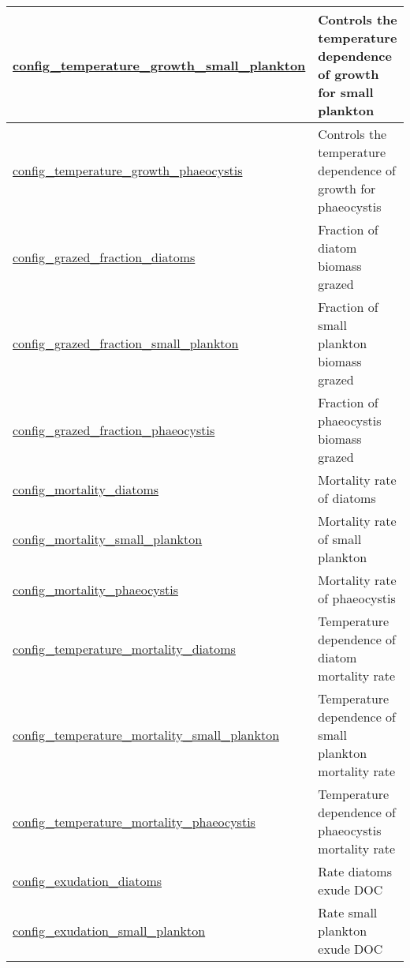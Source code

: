{\begin{center}
\begin{longtable}{| p{2.0in} || p{4.0in} |}
    \hline
    \hyperref[subsec:nm_sec_config_temperature_growth_small_plankton]{config\_temperature\_growth\_\-small\_plankton} & Controls the temperature dependence of growth for small plankton \\
    \hline
    \hyperref[subsec:nm_sec_config_temperature_growth_phaeocystis]{config\_temperature\_growth\_\-phaeocystis} & Controls the temperature dependence of growth for phaeocystis \\
    \hline
    \hyperref[subsec:nm_sec_config_grazed_fraction_diatoms]{config\_grazed\_fraction\_diatoms} & Fraction of diatom biomass grazed \\
    \hline
    \hyperref[subsec:nm_sec_config_grazed_fraction_small_plankton]{config\_grazed\_fraction\_small\_\-plankton} & Fraction of small plankton biomass grazed \\
    \hline
    \hyperref[subsec:nm_sec_config_grazed_fraction_phaeocystis]{config\_grazed\_fraction\_\-phaeocystis} & Fraction of phaeocystis biomass grazed \\
    \hline
    \hyperref[subsec:nm_sec_config_mortality_diatoms]{config\_mortality\_diatoms} & Mortality rate of diatoms \\
    \hline
    \hyperref[subsec:nm_sec_config_mortality_small_plankton]{config\_mortality\_small\_\-plankton} & Mortality rate of small plankton \\
    \hline
    \hyperref[subsec:nm_sec_config_mortality_phaeocystis]{config\_mortality\_phaeocystis} & Mortality rate of phaeocystis \\
    \hline
    \hyperref[subsec:nm_sec_config_temperature_mortality_diatoms]{config\_temperature\_mortality\_\-diatoms} & Temperature dependence of diatom mortality rate \\
    \hline
    \hyperref[subsec:nm_sec_config_temperature_mortality_small_plankton]{config\_temperature\_mortality\_\-small\_plankton} & Temperature dependence of small plankton mortality rate \\
    \hline
    \hyperref[subsec:nm_sec_config_temperature_mortality_phaeocystis]{config\_temperature\_mortality\_\-phaeocystis} & Temperature dependence of phaeocystis mortality rate \\
    \hline
    \hyperref[subsec:nm_sec_config_exudation_diatoms]{config\_exudation\_diatoms} & Rate diatoms exude DOC \\
    \hline
    \hyperref[subsec:nm_sec_config_exudation_small_plankton]{config\_exudation\_small\_\-plankton} & Rate small plankton exude DOC \\

\end{longtable}
\end{center}}

